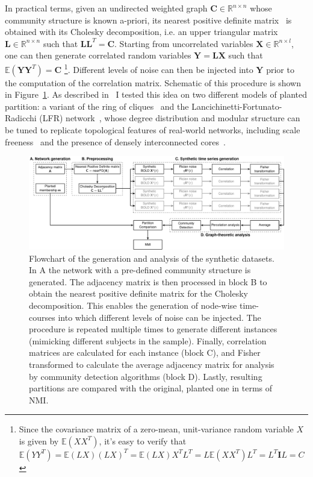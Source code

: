 In practical terms, given an undirected weighted graph  $\mathbf{C} \in \mathbb{R}^{n\times n}$ whose community structure is known a-priori, its nearest positive definite matrix~\cite{Higham1988} is obtained with its Cholesky decomposition, i.e. an upper triangular matrix $\mathbf{L}\in \mathbb{R}^{n\times n}$ such that $\mathbf{L}\mathbf{L}^T=\mathbf{C}$.
Starting from uncorrelated variables $\mathbf{X} \in \mathbb{R}^{n \times l}$, one can then generate correlated random variables $\mathbf{Y}=\mathbf{L} \mathbf{X}$ such that $\mathbb{E}(\mathbf{Y}\mathbf{Y}^T)=\mathbf{C}$ \footnote{Since the covariance matrix of a zero-mean, unit-variance random variable $X$ is given by $\mathbb{E}(XX^T)$, it's easy to verify that $\mathbb{E}(YY^T)=\mathbb{E}(LX)(LX)^T=\mathbb{E}(LX)X^T L^T=L\mathbb{E}(XX^T)L^T=L^T\mathbf{I}L=C$}.
Different levels of noise can then be injected into $\mathbf{Y}$ prior to the computation of the correlation matrix.
Schematic of this procedure is shown in Figure~\ref{fig:flowchart}.
As described in~\cite{nicolini2017} I tested this idea on two different models of planted partition: a variant of the ring of cliques~\cite{fortunato2007} and the Lancichinetti-Fortunato-Radicchi (LFR) network~\cite{lancichinetti2008}, whose degree distribution and modular structure can be tuned to replicate topological features of real-world networks, including scale freeness~\cite{hagmann2008} and the presence of densely interconnected cores~\cite{vandenheuvel2011}.

\begin{figure}[htb!]
\centering
\includegraphics[width=\textwidth]{images/flowchart.pdf}
\caption{Flowchart of the generation and analysis of the synthetic datasets. In A the network with a pre-defined community structure is generated. The adjacency matrix is then processed in block B to obtain the nearest positive definite matrix for the Cholesky decomposition. This enables the generation of node-wise time-courses into which different levels of noise can be injected. The procedure is repeated multiple times to generate different instances (mimicking different subjects in the sample). Finally, correlation matrices are calculated for each instance (block C), and Fisher transformed to calculate the average adjacency matrix for analysis by community detection algorithms (block D). Lastly, resulting partitions are compared with the original, planted one in terms of NMI.}
\label{fig:flowchart}
\end{figure}

